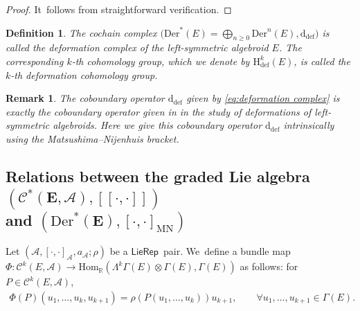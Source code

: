 \documentclass[10pt,a4paper]{amsart}
\numberwithin{equation}{section}
\newtheorem{rmk}[thm]{Remark}
\newtheorem{defi}[thm]{Definition}
\newcommand{\Real}{\mathbb R}
\newcommand{\huaA}{\mathcal{A}}
\newcommand{\huaC}{\mathcal{C}}
\newcommand{\Courant}[1]{\left[\!\left[ #1\right]\!\right]}
\newcommand{\dM}{\mathrm{d}}
\newcommand{\Hom}{\mathrm{Hom}}
\newcommand{\Der}{\mathrm{Der}}
\newcommand{\Hi}{\mathrm{H}}
\newcommand{\MN}{\mathrm{MN}}
\newcommand{\Def}{\mathrm{def}}
\newcommand{\LP}{$\mathsf{LieRep}$~}
\begin{document}
\begin{proof}
 It~follows from straightforward verification.
\end{proof}

\begin{defi}
The cochain complex $\big(\Der^*(E)=\bigoplus _{n\geq 0}\Der^n(E),\dM_{\Def}\big)$ is called
the {\it deformation complex} of the left-symmetric algebroid $E$. The corresponding $k$-th cohomology group, which we denote by $\Hi_{\Def}^k(E)$, is called the {\it $k$-th deformation cohomology group}.
\end{defi}

\begin{rmk}
 The coboundary operator $\dM_{\Def}$ given by \eqref{eq:deformation complex} is exactly the coboundary operator given in \cite{LiuShengBaiChen} in the study of deformations of left-symmetric algebroids. Here we give this coboundary operator $\dM_{\Def}$ intrinsically using the Matsushima--Nijenhuis bracket.
\end{rmk}



\subsection[Relations between the graded Lie algebra \protect{$(C\textasciicircum{}*(E,A),[[cdot,cdot]])$} and \protect{$(Der\textasciicircum{}*(E),[cdot,cdot]\_\{MN\})$}]
{Relations between the graded Lie algebra $\boldsymbol{(\huaC^*(E,\huaA),\Courant{\cdot,\cdot})}$\\ and $\boldsymbol{(\Der^*(E),[\cdot,\cdot]_{\MN})}$}



Let $(\huaA,[\cdot,\cdot]_\huaA,a_\huaA;\rho)$ be a \LP pair. We~define a bundle map $\Phi\colon \huaC^{k}(E,\huaA)\rightarrow \Hom_\Real(\Lambda^{k}\Gamma(E)\otimes
\Gamma(E),\Gamma(E))$ as follows: for $P\in\huaC^{k}(E,\huaA)$,
\begin{gather}\label{ex:MC-eleven}
\Phi(P)(u_1,\dots,u_k,u_{k+1})=\rho(P(u_1,\dots,u_k))u_{k+1}, \qquad
\forall u_1,\dots,u_{k+1}\in\Gamma(E).
\end{gather}
\end{document}

